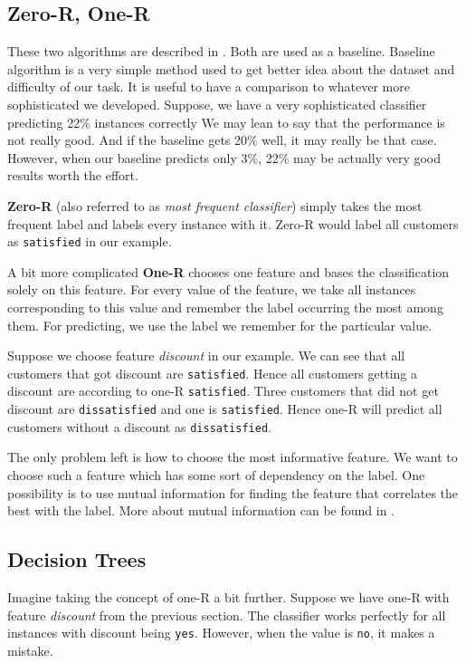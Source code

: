 \subsection{Zero-R, One-R}

These two algorithms are described in \citet{nasa2012evaluation}.
Both are used as a baseline.
Baseline algorithm is a very simple method used to get better idea about the dataset and difficulty of our task.
It is useful to have a comparison to whatever more sophisticated we developed.
Suppose, we have a very sophisticated classifier predicting 22\% instances correctly
We may lean to say that the performance is not really good.
And if the baseline gets 20\% well, it may really be that case.
However, when our baseline predicts only 3\%, 22\% may be actually very good results worth the effort.

{\bf Zero-R} (also referred to as \textit{most frequent classifier}) simply takes the most frequent label and labels every instance with it.
Zero-R would label all customers as \texttt{satisfied} in our example.

A bit more complicated {\bf One-R} chooses one feature and bases the classification solely on this feature.
For every value of the feature, we take all instances corresponding to this value and remember the label occurring the most among them.
For predicting, we use the label we remember for the particular value.

Suppose we choose feature \textit{discount} in our example.
We can see that all customers that got discount are \texttt{satisfied}.
Hence all customers getting a discount are according to one-R \texttt{satisfied}.
Three customers that did not get discount are \texttt{dissatisfied} and one is \texttt{satisfied}.
Hence one-R will predict all customers without a discount as \texttt{dissatisfied}.

The only problem left is how to choose the most informative feature.
We want to choose such a feature which has some sort of dependency on the label.
One possibility is to use mutual information for finding the feature
that correlates the best with the label.
More about mutual information can be found in .


\subsection{Decision Trees}\label{subsec:decisiontree}

Imagine taking the concept of one-R a bit further.
Suppose we have one-R with feature \textit{discount} from the previous section.
The classifier works perfectly for all instances with discount being \texttt{yes}.
However, when the value is \texttt{no}, it makes a mistake.

